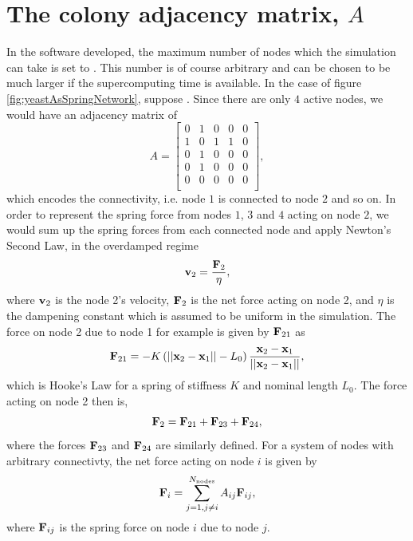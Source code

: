 \section{The colony adjacency matrix, $A$}
In the software  developed, the maximum 
number of nodes which the simulation can take is set to 
. This number is of course arbitrary and 
can be chosen to be much larger if the supercomputing time is available. 
In the case of figure \ref{fig:yeastAsSpringNetwork}, suppose
. Since there are only $4$ active nodes,
we would have an adjacency matrix of 
\begin{equation*}
    A = 
    \begin{bmatrix}
    0 & 1 & 0 & 0 & 0  \\
    1 & 0 & 1 & 1 & 0  \\
    0 & 1 & 0 & 0 & 0  \\
    0 & 1 & 0 & 0 & 0  \\
    0 & 0 & 0 & 0 & 0  \\ 
    \end{bmatrix},
\end{equation*}
which encodes the connectivity, i.e. node $1$ is connected to node $2$ and so on.
In order to represent the spring force from nodes $1$, $3$ and $4$ acting on node $2$,
we would sum up the spring forces from each connected node and apply Newton's Second Law, 
in the overdamped regime
\begin{equation*}
    \vb{v}_2 = \frac{\vb{F}_2}{\eta},
\end{equation*}
where $\vb{v}_2$ is the node 2's velocity, $\vb{F}_2$ is the net force acting on 
node 2, and $\eta$ is the dampening constant which is assumed to be uniform in the simulation.
The force on node 2 due to node 1 for example is given by $\vb{F}_{21}$ as 
\begin{equation*}
    \vb{F}_{21} = -K \left( ||\vb{x}_2 - \vb{x}_1|| - L_0 \right) \frac{\vb{x}_2 - \vb{x}_1}{||\vb{x}_2 - \vb{x}_1||},
\end{equation*}
which is Hooke's Law for a spring of stiffness $K$ and nominal length $L_0$.
The force acting on node 2 then is,
\begin{equation*}
    \vb{F}_{2} = \vb{F}_{21} + \vb{F}_{23} + \vb{F}_{24},
\end{equation*}
where the forces $\vb{F}_{23}$ and $\vb{F}_{24}$ are similarly defined. For a
system of nodes with arbitrary connectivty, the net force 
acting on node $i$ is given by 
\begin{equation*}
    \vb{F}_{i} = \sum_{j = 1, j \neq i}^{N_{\textrm{nodes}}} A_{ij} \vb{F}_{ij},
\end{equation*}
where $\vb{F}_{ij}$ is the spring force on node $i$ due to node $j$.
\\


